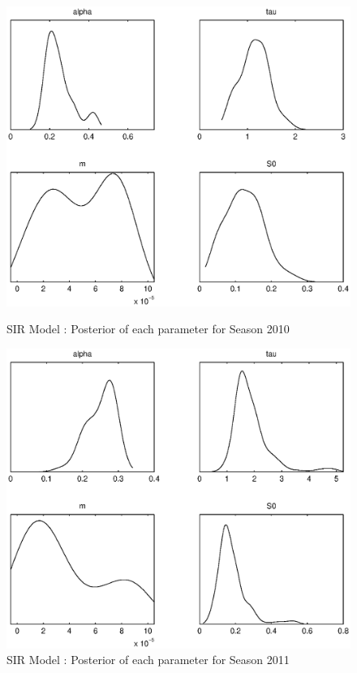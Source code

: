 \documentclass[11pt, a4paper]{article}
\begin{document}
\begin{figure}[H!]
\FloatBarrier
\centering
    \includegraphics[height = 0.25\textheight]{figures/SIR_posterior_season1.eps}
    \caption{SIR Model : Posterior of each parameter for Season 2010}
    \label{fig:sir_post1}
    \includegraphics[height = 0.25\textheight]{figures/SIR_posterior_season2.eps}
    \caption{SIR Model : Posterior of each parameter for Season 2011}
    \label{fig:sir_post2}

\end{figure}
\end{document}
